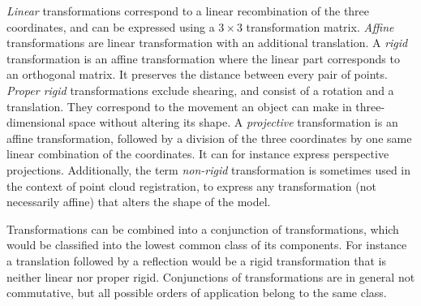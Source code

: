 \emph{Linear} transformations correspond to a linear recombination of the three coordinates, and can be expressed using a $3 \times 3$ transformation matrix. \emph{Affine} transformations are linear transformation with an additional translation. A \emph{rigid} transformation is an affine transformation where the linear part corresponds to an orthogonal matrix. It preserves the distance between every pair of points. \emph{Proper rigid} transformations exclude shearing, and consist of a rotation and a translation. They correspond to the movement an object can make in three-dimensional space without altering its shape. A \emph{projective} transformation is an affine transformation, followed by a division of the three coordinates by one same linear combination of the coordinates. It can for instance express perspective projections. Additionally, the term \emph{non-rigid} transformation is sometimes used in the context of point cloud registration, to express any transformation (not necessarily affine) that alters the shape of the model.

Transformations can be combined into a conjunction of transformations, which would be classified into the lowest common class of its components. For instance a translation followed by a reflection would be a rigid transformation that is neither linear nor proper rigid. Conjunctions of transformations are in general not commutative, but all possible orders of application belong to the same class.

